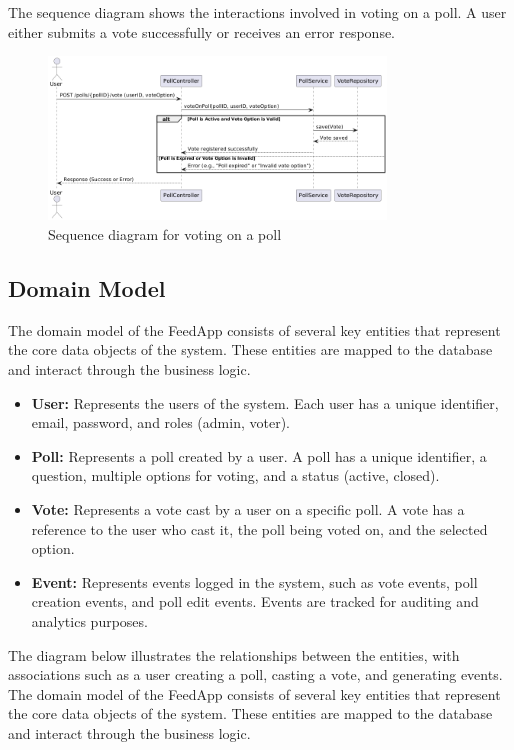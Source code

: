 \vspace{0.2cm}
\noindent The sequence diagram shows the interactions involved in voting on a poll. A user either submits a vote successfully or receives an error response.

\begin{figure}[H]
	\centering
	\includegraphics[width=0.8\textwidth]{../images/SequenceDiagramVotingLogic.png}
	\caption{Sequence diagram for voting on a poll}
	\label{fig:sequence_diagram}
\end{figure}

\subsection{Domain Model}
The domain model of the FeedApp consists of several key entities that represent the core data objects of the system. These entities are mapped to the database and interact through the business logic.
\begin{itemize}
    \item \textbf{User:} Represents the users of the system. Each user has a unique identifier, email, password, and roles (admin, voter).
    \item \textbf{Poll:} Represents a poll created by a user. A poll has a unique identifier, a question, multiple options for voting, and a status (active, closed).
    \item \textbf{Vote:} Represents a vote cast by a user on a specific poll. A vote has a reference to the user who cast it, the poll being voted on, and the selected option.
    \item \textbf{Event:} Represents events logged in the system, such as vote events, poll creation events, and poll edit events. Events are tracked for auditing and analytics purposes.
\end{itemize}

\noindent The diagram below illustrates the relationships between the entities, with associations such as a user creating a poll, casting a vote, and generating events. The domain model of the FeedApp consists of several key entities that represent the core data objects of the system. These entities are mapped to the database and interact through the business logic.

